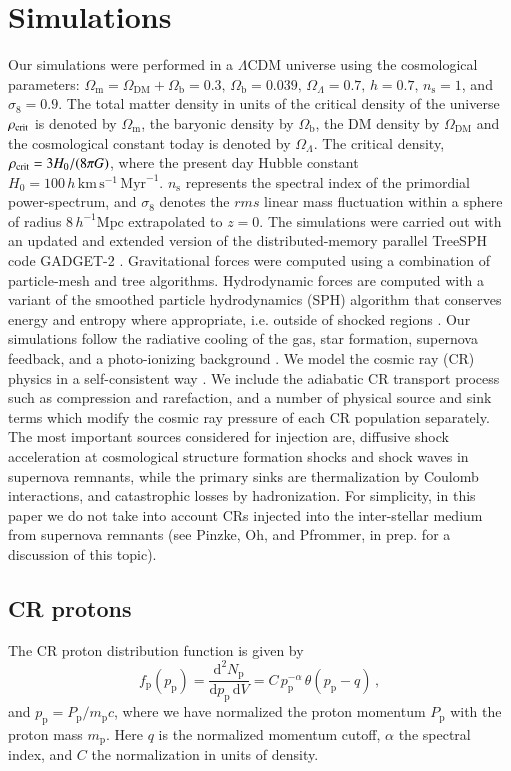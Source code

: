 \documentclass[useAMS,usenatbib]{mn2e}
\newcommand{\dd}{\mathrm{d}}
\newcommand{\p}{\mathrm{p}}
\newcommand{\mr}{\mathrm}
\newcommand{\DM}{\mathrm{DM}}
\begin{document}
\section{Simulations}
\label{sect:simulations}
Our simulations were performed in a $\Lambda$CDM universe using the
cosmological parameters: $\Omega_{\mr m}=\Omega_\DM + \Omega_{\mr
  b}=0.3, \, \Omega_{\mr b}=0.039, \, \Omega_\Lambda=0.7, \, h=0.7, \,
n_{\mr s}=1$, and $\sigma_8=0.9$. The total matter density in units of
the critical density of the universe $\rho_{\rm crit}$ is denoted by
$\Omega_{\mr m}$, the baryonic density by $\Omega_{\mr b}$, the DM
density by $\Omega_\DM$ and the cosmological constant today is denoted
by $\Omega_\Lambda$. The critical density, $\rho_{\rm crit}=3H_0/(8\pi
G)$, where the present day Hubble constant $H_0=100\, h \, \mr{km}\,
\mr{s}^{-1} \, \mr{Myr}^{-1}$. $n_{\mr s}$ represents the spectral
index of the primordial power-spectrum, and $\sigma_8$ denotes the
$rms$ linear mass fluctuation within a sphere of radius $8 \,h^{-1}
\mr{Mpc}$ extrapolated to $z = 0$. The simulations were carried out
with an updated and extended version of the distributed-memory
parallel TreeSPH code GADGET-2 \citep{2005MNRAS.364.1105S,
  2001NewA....6...79S}. Gravitational forces were computed using a
combination of particle-mesh and tree algorithms.  Hydrodynamic forces
are computed with a variant of the smoothed particle hydrodynamics
(SPH) algorithm that conserves energy and entropy where appropriate,
i.e. outside of shocked regions \citep{2002MNRAS.333..649S}.  Our
simulations follow the radiative cooling of the gas, star formation,
supernova feedback, and a photo-ionizing background \citep[details can
  be found in][]{2007MNRAS.378..385P}. We model the cosmic ray (CR)
physics in a self-consistent way \citep{2006MNRAS.367..113P,
  2007A&A...473...41E, 2008A&A...481...33J}.  We include the adiabatic
CR transport process such as compression and rarefaction, and a number
of physical source and sink terms which modify the cosmic ray pressure
of each CR population separately. The most important sources
considered for injection are, diffusive shock acceleration at
cosmological structure formation shocks and shock waves in supernova
remnants, while the primary sinks are thermalization by Coulomb
interactions, and catastrophic losses by hadronization. For
simplicity, in this paper we do not take into account CRs injected
into the inter-stellar medium from supernova remnants (see Pinzke, Oh,
and Pfrommer, in prep. for a discussion of this topic).

\subsection{CR protons}
The CR proton distribution function is given by
\begin{equation}
  \label{eq:f_p}
  f_\p(p_\p) = \frac{\dd^2 N_\p}{\dd p_\p\,\dd V} = 
  C\, p_\p^{-\alpha}\,\theta(p_\p-q)\,, 
\end{equation}
and $p_\p = P_\p/m_\p c$, where we have normalized the proton momentum
$P_\p$ with the proton mass $m_\p$.  Here $q$ is the normalized
momentum cutoff, $\alpha$ the spectral index, and $C$ the
normalization in units of density. 
\end{document}
